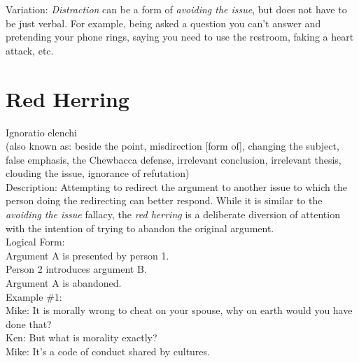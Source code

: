 \documentclass[a4paper,12pt,single,pdftex]{scrartcl}
\begin{document}
{      
        Variation: {\it Distraction} can be a form of {\it avoiding the issue}, but does not have to be just verbal.  For example, being asked a question you can’t answer and pretending your phone rings, saying you need to use the restroom, faking a heart attack, etc.
      \\

    
    \section{
      Red Herring
    }
  
    

    
      
        Ignoratio elenchi
      \\

      
        (also known as: beside the point, misdirection [form of], changing the subject, false emphasis, the Chewbacca defense, irrelevant conclusion, irrelevant thesis, clouding the issue, ignorance of refutation)
      \\

      
        Description: Attempting to redirect the argument to another issue to which the person doing the redirecting can better respond. While it is similar to the {\it avoiding the issue} fallacy, the {\it red herring }is a deliberate diversion of attention with the intention of trying to abandon the original argument.
      \\

      
        Logical Form:
      \\

      
        Argument A is presented by person 1.
      \\

      
        Person 2 introduces argument B.
      \\

      
        Argument A is abandoned.
      \\

      
        Example \#1:
      \\

      
        Mike: It is morally wrong to cheat on your spouse, why on earth would you have done that?
      \\

      
        Ken: But what is morality exactly?
      \\

      
        Mike: It’s a code of conduct shared by cultures.
      \\

}
\end{document}
